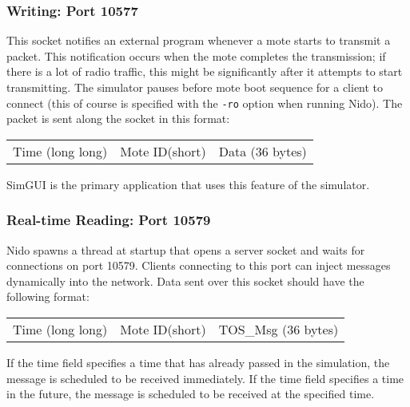 \documentclass[10pt]{article}
\begin{document}
\subsubsection*{Writing: Port 10577}

This socket notifies an external program whenever a mote starts to
transmit a packet. This notification occurs when the mote completes
the transmission; if there is a lot of radio traffic, this might be
significantly after it attempts to start transmitting. The simulator pauses before mote boot sequence for a client to
connect (this of course is specified with the {\tt -ro} option when running Nido). The packet is sent along the socket in this format:

\vspace{0.1in}
\begin{tabular}{|c|c|c|}\hline
\hspace{2in} & \hspace{2in} & \hspace{0.5in} \\ \hline
Time (long long)& Mote ID(short) & Data (36 bytes) \\ \hline
\end{tabular}
\vspace{0.1in}

SimGUI is the primary application that uses this feature of the simulator.


\subsubsection*{Real-time Reading: Port 10579}

Nido spawns a thread at startup that opens a server socket and waits
for connections on port 10579. Clients connecting to this port can
inject messages dynamically into the network. Data sent over this
socket should have the following format:

\vspace{0.1in}
\begin{tabular}{|c|c|c|}\hline
\hspace{2in} & \hspace{2in} & \hspace{0.5in} \\ \hline
Time (long long)& Mote ID(short) & TOS\_Msg (36 bytes) \\ \hline
\end{tabular}
\vspace{0.1in}

If the time field specifies a time that has already passed in the
simulation, the message is scheduled to be received immediately. If
the time field specifies a time in the future, the message is
scheduled to be received at the specified time.
\end{document}
